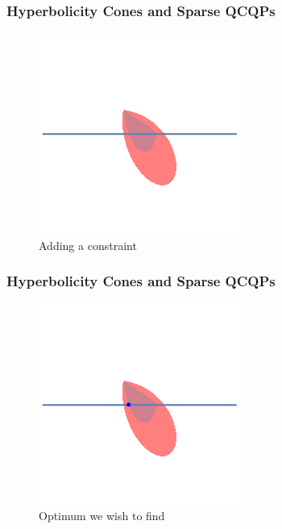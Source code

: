 \documentclass{beamer}
\begin{document}
\begin{frame}
    \frametitle{Hyperbolicity Cones and Sparse QCQPs}
    \begin{figure}[htpb]
        \centering
        \includegraphics[width=0.6\linewidth]{comparison_line_rotated.png}
        \caption{Adding a constraint}%
        \label{fig:comparison_line}
    \end{figure}
\end{frame}
\begin{frame}
    \frametitle{Hyperbolicity Cones and Sparse QCQPs}
    \begin{figure}[htpb]
        \centering
        \includegraphics[width=0.6\linewidth]{optimum.png}
        \caption{Optimum we wish to find}%
        \label{fig:comparison_line}
    \end{figure}
\end{frame}
\end{document}
